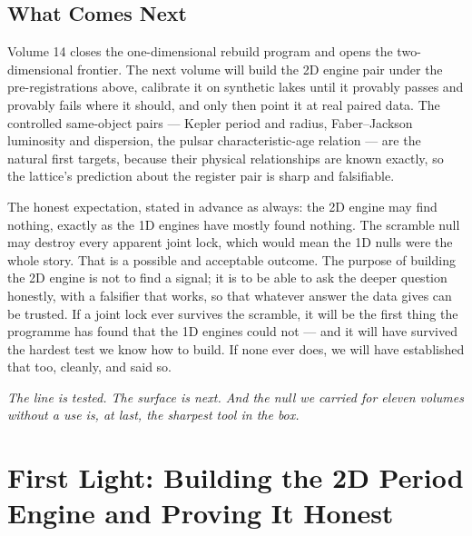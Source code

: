 \documentclass[11pt, letterpaper, openany]{book}
\begin{document}
\section{What Comes Next}

Volume 14 closes the one-dimensional rebuild program and opens the two-dimensional frontier. The
next volume will build the 2D engine pair under the pre-registrations above, calibrate it on
synthetic lakes until it provably passes and provably fails where it should, and only then point
it at real paired data. The controlled same-object pairs --- Kepler period and radius,
Faber--Jackson luminosity and dispersion, the pulsar characteristic-age relation --- are the
natural first targets, because their physical relationships are known exactly, so the lattice's
prediction about the register pair is sharp and falsifiable.

\begin{warningbox}
The honest expectation, stated in advance as always: the 2D engine may find nothing, exactly as
the 1D engines have mostly found nothing. The scramble null may destroy every apparent joint lock,
which would mean the 1D nulls were the whole story. That is a possible and acceptable outcome. The
purpose of building the 2D engine is not to find a signal; it is to be able to ask the deeper
question honestly, with a falsifier that works, so that whatever answer the data gives can be
trusted. If a joint lock ever survives the scramble, it will be the first thing the programme has
found that the 1D engines could not --- and it will have survived the hardest test we know how to
build. If none ever does, we will have established that too, cleanly, and said so.
\end{warningbox}

\begin{center}
\vspace{0.5em}
\itshape
The line is tested. The surface is next. And the null we carried for eleven volumes without a use
is, at last, the sharpest tool in the box.
\vspace{0.5em}
\end{center}


\chapter{First Light: Building the 2D Period Engine and Proving It Honest}
\end{document}
